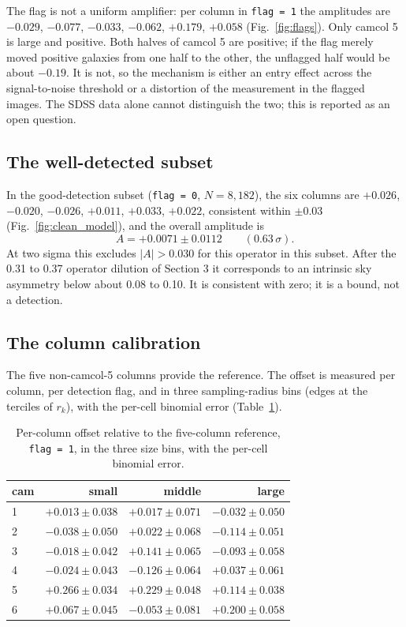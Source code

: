 \documentclass[preprint,12pt,authoryear]{elsarticle}
\begin{document}
The flag is not a uniform amplifier: per column in \texttt{flag = 1} the amplitudes are $-0.029$,
$-0.077$, $-0.033$, $-0.062$, $+0.179$, $+0.058$ (Fig.~\ref{fig:flags}). Only camcol 5 is large and
positive. Both halves of camcol 5 are positive; if the flag merely moved positive galaxies from one
half to the other, the unflagged half would be about $-0.19$. It is not, so the mechanism is either
an entry effect across the signal-to-noise threshold or a distortion of the measurement in the
flagged images. The SDSS data alone cannot distinguish the two; this is reported as an open
question.

\subsection{The well-detected subset}
In the good-detection subset (\texttt{flag = 0}, $N = 8,182$), the six columns are $+0.026$,
$-0.020$, $-0.026$, $+0.011$, $+0.033$, $+0.022$, consistent within $\pm 0.03$
(Fig.~\ref{fig:clean_model}), and the overall amplitude is
\begin{equation}
A = +0.0071 \pm 0.0112 \qquad (0.63\,\sigma).
\end{equation}
At two sigma this excludes $|A| > 0.030$ for this operator in this subset. After the 0.31 to 0.37
operator dilution of Section 3 it corresponds to an intrinsic sky asymmetry below about 0.08 to
0.10. It is consistent with
zero; it is a bound, not a detection.

\subsection{The column calibration}
The five non-camcol-5 columns provide the reference. The offset is measured per column, per detection flag, and in three sampling-radius bins (edges at
the terciles of $r_k$), with the per-cell binomial error (Table~\ref{tab:calib}).

\begin{table}[htbp]
\centering
\caption{Per-column offset relative to the five-column reference, \texttt{flag = 1}, in the three size bins,
with the per-cell binomial error.}
\label{tab:calib}
\begin{tabular}{lrrr}
\toprule
cam & small & middle & large \\
\midrule
1 & $+0.013 \pm 0.038$ & $+0.017 \pm 0.071$ & $-0.032 \pm 0.050$ \\
2 & $-0.038 \pm 0.050$ & $+0.022 \pm 0.068$ & $-0.114 \pm 0.051$ \\
3 & $-0.018 \pm 0.042$ & $+0.141 \pm 0.065$ & $-0.093 \pm 0.058$ \\
4 & $-0.024 \pm 0.043$ & $-0.126 \pm 0.064$ & $+0.037 \pm 0.061$ \\
5 & $+0.266 \pm 0.034$ & $+0.229 \pm 0.048$ & $+0.114 \pm 0.038$ \\
6 & $+0.067 \pm 0.045$ & $-0.053 \pm 0.081$ & $+0.200 \pm 0.058$ \\
\bottomrule
\end{tabular}
\end{table}
\end{document}
